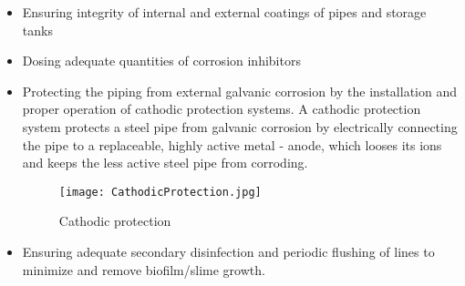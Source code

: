 \begin{itemize}
\begin{itemize}
\item Ensuring integrity of internal and external coatings of pipes and storage tanks
\item Dosing adequate quantities of corrosion inhibitors
\item Protecting the piping from external galvanic corrosion by the installation and proper operation of cathodic protection systems.  A cathodic protection system  protects a steel pipe from galvanic corrosion by electrically connecting the pipe to a replaceable, highly active metal - anode, which looses its ions and keeps the less active steel pipe from corroding. 
\begin{figure}[H]
			      	\begin{center}
			      		\texttt{[image: CathodicProtection.jpg]}\\
			      		\caption{Cathodic protection}
			      	\end{center}
\end{figure} 

\item Ensuring adequate secondary disinfection and periodic flushing of lines to minimize and remove biofilm/slime growth.
\end{itemize}


\end{itemize}
